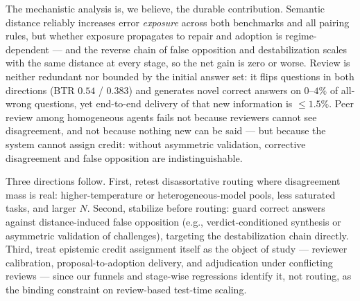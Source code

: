 \documentclass[11pt]{article}
\begin{document}
The mechanistic analysis is, we believe, the durable contribution. Semantic distance reliably increases error \emph{exposure} across both benchmarks and all pairing rules, but whether exposure propagates to repair and adoption is regime-dependent --- and the reverse chain of false opposition and destabilization scales with the same distance at every stage, so the net gain is zero or worse. Review is neither redundant nor bounded by the initial answer set: it flips questions in both directions (BTR $0.54$ / $0.383$) and generates novel correct answers on $0$--$4\%$ of all-wrong questions, yet end-to-end delivery of that new information is $\le 1.5\%$. Peer review among homogeneous agents fails not because reviewers cannot see disagreement, and not because nothing new can be said --- but because the system cannot assign credit: without asymmetric validation, corrective disagreement and false opposition are indistinguishable.

Three directions follow. First, retest disassortative routing where disagreement mass is real: higher-temperature or heterogeneous-model pools, less saturated tasks, and larger $N$. Second, stabilize before routing: guard correct answers against distance-induced false opposition (e.g., verdict-conditioned synthesis or asymmetric validation of challenges), targeting the destabilization chain directly. Third, treat epistemic credit assignment itself as the object of study --- reviewer calibration, proposal-to-adoption delivery, and adjudication under conflicting reviews --- since our funnels and stage-wise regressions identify it, not routing, as the binding constraint on review-based test-time scaling.
\end{document}
